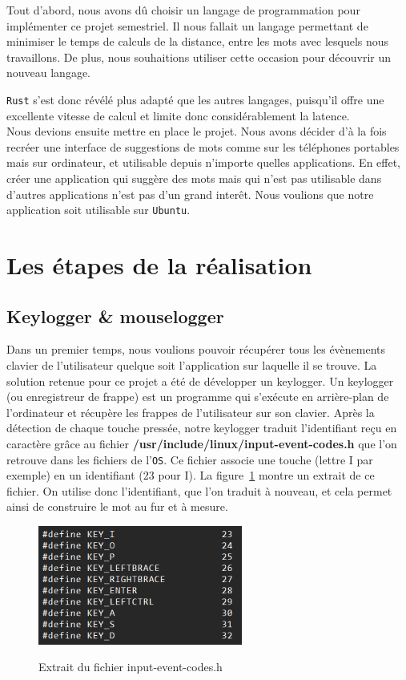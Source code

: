 \documentclass[a4paper, 11pt]{report}
\newcommand{\langage}[1]{\texttt{#1}}
\begin{document}
Tout d'abord, nous avons dû choisir un langage de programmation pour implémenter ce projet semestriel. Il nous fallait un langage permettant de minimiser le temps de calculs de la distance, entre les mots avec lesquels nous travaillons. De plus, nous souhaitions utiliser cette occasion pour découvrir un nouveau langage.~{\langage{Rust} s’est donc révélé plus adapté que les autres langages, puisqu’il offre une excellente vitesse de calcul et limite donc considérablement la latence.\\

Nous devions ensuite mettre en place le projet. Nous avons décider d'à la fois recréer une interface de suggestions de mots comme sur les téléphones portables mais sur ordinateur, et utilisable depuis n'importe quelles applications. En effet, créer une application qui suggère des mots mais qui n'est pas utilisable dans d'autres applications n'est pas d'un grand interêt. Nous voulions que notre application soit utilisable sur \langage{Ubuntu}.

\section{Les étapes de la réalisation}

\subsection{Keylogger \& mouselogger}

Dans un premier temps, nous voulions pouvoir récupérer tous les évènements clavier de l'utilisateur quelque soit l'application sur laquelle il se trouve. La solution retenue pour ce projet a été de développer un keylogger. Un keylogger (ou enregistreur de frappe) est un programme qui s’exécute en arrière-plan de l'ordinateur et récupère les frappes de l’utilisateur sur son clavier. Après la détection de chaque touche pressée, notre keylogger traduit l'identifiant reçu en caractère grâce au fichier \textbf{/usr/include/linux/input-event-codes.h} que l'on retrouve dans les fichiers de l'\langage{OS}. Ce fichier associe une touche (lettre I par exemple) en un identifiant (23 pour I). La figure~\ref{fig:lecture_touche} montre un extrait de ce fichier. On utilise donc l'identifiant, que l'on traduit à nouveau, et cela permet ainsi de construire le mot au fur et à mesure. \\

\begin{figure}[H]
	\begin{center}
		{\includegraphics[width=0.6\textwidth]{images/fichier_touche.png}}
	\end{center}
	\caption{Extrait du fichier input-event-codes.h}
	\label{fig:lecture_touche}
\end{figure}

}
\end{document}
